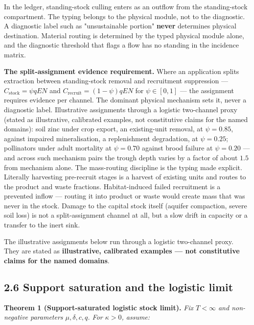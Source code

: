 \documentclass[11pt]{article}
\begin{document}
In the ledger, standing-stock culling enters as an outflow from the standing-stock compartment. The typing belongs to the physical module, not to the diagnostic. A diagnostic label such as "unsustainable portion" \textbf{never} determines physical destination. Material routing is determined by the typed physical module alone, and the diagnostic threshold that flags a flow has no standing in the incidence matrix.

\textbf{The split-assignment evidence requirement.} Where an application splits extraction between standing-stock removal and recruitment suppression --- \(C_{\mathrm{stock}} = \psi qEN\) and \(C_{\mathrm{recruit}} =\allowbreak{} (1-\psi)qEN\) for \(\psi \in [0,1]\) --- the assignment requires evidence per channel. The dominant physical mechanism sets it, never a diagnostic label. Illustrative assignments through a logistic two-channel proxy (stated as illustrative, calibrated examples, not constitutive claims for the named domains): soil zinc under crop export, an existing-unit removal, at \(\psi = 0.85\), against impaired mineralisation, a replenishment degradation, at \(\psi = 0.25\); pollinators under adult mortality at \(\psi = 0.70\) against brood failure at \(\psi = 0.20\) --- and across such mechanism pairs the trough depth varies by a factor of about \(1.5\) from mechanism alone. The mass-routing discipline is the typing made explicit. Literally harvesting pre-recruit stages is a harvest of existing units and routes to the product and waste fractions. Habitat-induced failed recruitment is a prevented inflow --- routing it into product or waste would create mass that was never in the stock. Damage to the capital stock itself (aquifer compaction, severe soil loss) is not a split-assignment channel at all, but a slow drift in capacity or a transfer to the inert sink.

The illustrative assignments below run through a logistic two-channel proxy. They are stated as \textbf{illustrative, calibrated examples --- not constitutive claims for the named domains}.

\subsection*{2.6 Support saturation and the logistic limit}\label{26-support-saturation-and-the-logistic-limit}

\textbf{Theorem 1 (Support-saturated logistic stock limit).} \emph{Fix \(T < \infty\) and non-negative parameters \(\mu, \delta, c, q\). For \(\kappa > 0\), assume:}
\end{document}
